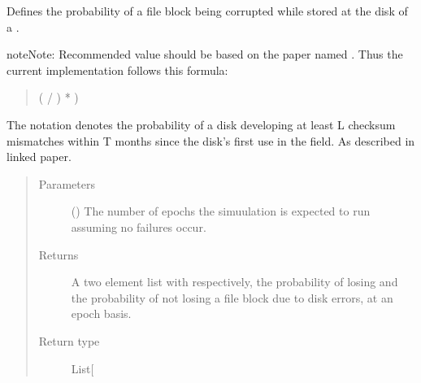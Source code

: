 \documentclass[letterpaper,10pt,english]{sphinxmanual}
\begin{document}
\begin{fulllineitems}
\label{\detokenize{app:app.environment_settings.get_disk_error_chances}}
Defines the probability of a file block being corrupted while stored
at the disk of a {\hyperref[\detokenize{app.domain:app.domain.network_nodes.Node}]{}}.

\begin{sphinxadmonition}{note}{Note:}
Recommended value should be based on the paper named
. Thus
the current implementation follows this formula:
\begin{quote}

({\hyperref[\detokenize{app.domain:app.domain.master_servers.Master.MAX_EPOCHS}]{}} / {\hyperref[\detokenize{app:app.environment_settings.MONTH_EPOCHS}]{}}) * )
\end{quote}

The notation  denotes the probability of a disk
developing at least L checksum mismatches within T months since
the disk’s first use in the field. As described in linked paper.
\end{sphinxadmonition}
\begin{quote}\begin{description}
\item[{Parameters}] \leavevmode
{} () \textendash{} The number of epochs the simuulation is expected to run
assuming no failures occur.

\item[{Returns}] \leavevmode
A two element list with respectively, the probability of losing
and the probability of not losing a file block due to disk
errors, at an epoch basis.

\item[{Return type}] \leavevmode
List{[}\sphinxhref{https://docs.python.org/3.7/library/functions.html\#float}{float}{]}

\end{description}\end{quote}

\end{fulllineitems}
\end{document}
